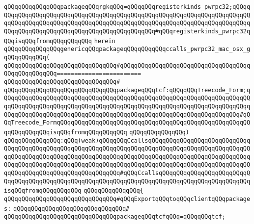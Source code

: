 \verb|qQQqqQQqqQQqqQQqpackageqQQqrgkqQQq=qQQqqQQqregisterkinds_pwrpc32;qQQqqQQqqQQqqQQqqQQqqQQqqQQqqQQqqQQqqQQqqQQqqQQqqQQqqQQqqQQqqQQqqQQqqQQqqQQqqQQqqQQqqQQqqQQqqQQqqQQqqQQqqQQqqQQqqQQqqQQqqQQqqQQqqQQqqQQqqQQqqQQqqQQqqQQqqQQqqQQqqQQqqQQqqQQqqQQqqQQqqQQqqQQq#qQQqregisterkinds_pwrpc32qQQqisqQQqfromqQQqqQQqqQQq|\newline
\verb|herein|\newline
\newline
\verb|qQQqqQQqqQQqqQQqgenericqQQqpackageqQQqqQQqqQQqccalls_pwrpc32_mac_osx_gqQQqqQQqqQQq(|\newline
\verb|qQQqqQQqqQQqqQQqqQQqqQQqqQQqqQQq#qQQqqQQqqQQqqQQqqQQqqQQqqQQqqQQqqQQqqQQqqQQqqQQqqQQq========================|\newline
\verb|qQQqqQQqqQQqqQQqqQQqqQQqqQQqqQQq#|\newline
\verb|qQQqqQQqqQQqqQQqqQQqqQQqqQQqqQQqpackageqQQqtcf:qQQqqQQqTreecode_Form;qQQqqQQqqQQqqQQqqQQqqQQqqQQqqQQqqQQqqQQqqQQqqQQqqQQqqQQqqQQqqQQqqQQqqQQqqQQqqQQqqQQqqQQqqQQqqQQqqQQqqQQqqQQqqQQqqQQqqQQqqQQqqQQqqQQqqQQqqQQqqQQqqQQqqQQqqQQqqQQqqQQqqQQqqQQqqQQqqQQqqQQqqQQqqQQqqQQqqQQqqQQqqQQq#qQQqTreecode_FormqQQqqQQqqQQqqQQqqQQqqQQqqQQqqQQqqQQqqQQqqQQqqQQqqQQqqQQqqQQqqQQqqQQqisqQQqfromqQQqqQQqqQQq|\newline
\verb|qQQqqQQqqQQqqQQq)|\newline
\verb|qQQqqQQqqQQqqQQq:qQQq(weak)qQQqqQQqCcallsqQQqqQQqqQQqqQQqqQQqqQQqqQQqqQQqqQQqqQQqqQQqqQQqqQQqqQQqqQQqqQQqqQQqqQQqqQQqqQQqqQQqqQQqqQQqqQQqqQQqqQQqqQQqqQQqqQQqqQQqqQQqqQQqqQQqqQQqqQQqqQQqqQQqqQQqqQQqqQQqqQQqqQQqqQQqqQQqqQQqqQQqqQQqqQQqqQQqqQQqqQQqqQQqqQQqqQQqqQQqqQQqqQQqqQQqqQQqqQQqqQQqqQQqqQQqqQQqqQQqqQQqqQQqqQQq#qQQqCcallsqQQqqQQqqQQqqQQqqQQqqQQqqQQqqQQqqQQqqQQqqQQqqQQqqQQqqQQqqQQqqQQqqQQqqQQqqQQqqQQqqQQqqQQqqQQqqQQqisqQQqfromqQQqqQQqqQQq|\newline
\verb|qQQqqQQqqQQqqQQq{|\newline
\verb|qQQqqQQqqQQqqQQqqQQqqQQqqQQqqQQq#qQQqExportqQQqtoqQQqclientqQQqpackages:|\newline
\verb|qQQqqQQqqQQqqQQqqQQqqQQqqQQqqQQq#|\newline
\verb|qQQqqQQqqQQqqQQqqQQqqQQqqQQqqQQqpackageqQQqtcfqQQq=qQQqqQQqtcf;|\newline
